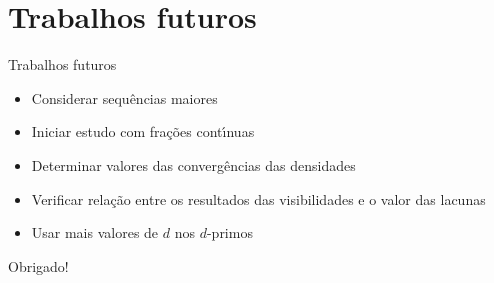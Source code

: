 \documentclass[12pt,
aspectratio=169,
]{beamer}
\begin{document}
\section{Trabalhos futuros}
\begin{frame}{Trabalhos futuros}
    \begin{itemize}
        \item Considerar sequ\^encias maiores
        \item Iniciar estudo com fra\c c\~oes cont\'\i nuas
        \item Determinar valores das converg\^encias das densidades
        \item Verificar rela\c c\~ao entre os resultados das visibilidades e o valor das lacunas
        \item Usar mais valores de $d$ nos $d$-primos
    \end{itemize}
\end{frame}





\begin{nobarframe}
\vfill
\begin{center}
\Large
Obrigado!
\end{center}
\vfill
\end{nobarframe}
\end{document}
